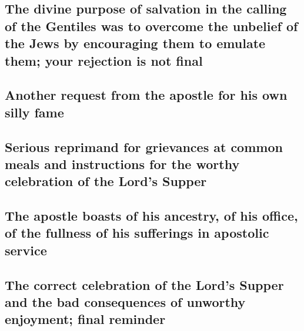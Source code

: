 \hypertarget{the-divine-purpose-of-salvation-in-the-calling-of-the-gentiles-was-to-overcome-the-unbelief-of-the-jews-by-encouraging-them-to-emulate-them-your-rejection-is-not-final}{%
\subsection{The divine purpose of salvation in the calling of the
Gentiles was to overcome the unbelief of the Jews by encouraging them to
emulate them; your rejection is not
final}\label{the-divine-purpose-of-salvation-in-the-calling-of-the-gentiles-was-to-overcome-the-unbelief-of-the-jews-by-encouraging-them-to-emulate-them-your-rejection-is-not-final}}

\hypertarget{another-request-from-the-apostle-for-his-own-silly-fame}{%
\subsection{Another request from the apostle for his own silly
fame}\label{another-request-from-the-apostle-for-his-own-silly-fame}}

\hypertarget{serious-reprimand-for-grievances-at-common-meals-and-instructions-for-the-worthy-celebration-of-the-lords-supper}{%
\subsection{Serious reprimand for grievances at common meals and
instructions for the worthy celebration of the Lord's
Supper}\label{serious-reprimand-for-grievances-at-common-meals-and-instructions-for-the-worthy-celebration-of-the-lords-supper}}

\hypertarget{the-apostle-boasts-of-his-ancestry-of-his-office-of-the-fullness-of-his-sufferings-in-apostolic-service}{%
\subsection{The apostle boasts of his ancestry, of his office, of the
fullness of his sufferings in apostolic
service}\label{the-apostle-boasts-of-his-ancestry-of-his-office-of-the-fullness-of-his-sufferings-in-apostolic-service}}

\hypertarget{the-correct-celebration-of-the-lords-supper-and-the-bad-consequences-of-unworthy-enjoyment-final-reminder}{%
\subsection{The correct celebration of the Lord's Supper and the bad
consequences of unworthy enjoyment; final
reminder}\label{the-correct-celebration-of-the-lords-supper-and-the-bad-consequences-of-unworthy-enjoyment-final-reminder}}

